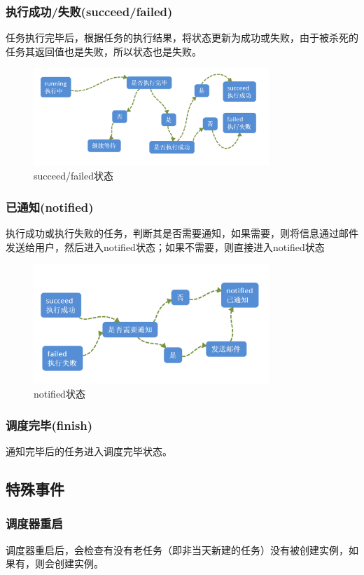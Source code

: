 ﻿\documentclass[a4paper]{report}
\begin{document}
\subsubsection{执行成功/失败(succeed/failed)} %
任务执行完毕后，根据任务的执行结果，将状态更新为成功或失败，由于被杀死的任务其返回值也是失败，所以状态也是失败。
\begin{figure}[htbp]
\centering\includegraphics[width=3.5in]{succeed.png}
\caption{succeed/failed状态}
\end{figure}

\subsubsection{已通知(notified)} %
执行成功或执行失败的任务，判断其是否需要通知，如果需要，则将信息通过邮件发送给用户，然后进入notified状态；如果不需要，则直接进入notified状态
\begin{figure}[htbp]
\centering\includegraphics[width=3.5in]{notified.png}
\caption{notified状态}\label{fig:1}
\end{figure}


\subsubsection{调度完毕(finish)} %
通知完毕后的任务进入调度完毕状态。



\subsection{特殊事件} %
\subsubsection{调度器重启} %
调度器重启后，会检查有没有老任务（即非当天新建的任务）没有被创建实例，如果有，则会创建实例。
\end{document}
